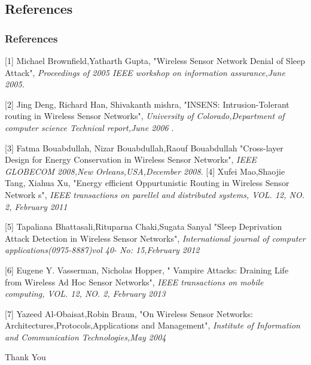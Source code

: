  \subsection{References}
\begin{frame}
\frametitle{References}
\footnotesize{
\begin{thebibliography}{99}



[1] Michael Brownfield,Yatharth Gupta,
 \newblock "Wireless Sensor Network Denial of Sleep Attack",
 \newblock \emph{Proceedings of 2005 IEEE workshop on information assurance,June 2005}.

 
  [2] Jing Deng, Richard Han, Shivakanth mishra,
 \newblock "INSENS: Intrusion-Tolerant routing in Wireless Sensor Networks",
 \newblock \emph{University of Colorado,Department of computer science Technical report,June 2006 }.

[3] Fatma Bouabdullah, Nizar Bouabdullah,Raouf Bouabdullah 
 \newblock "Cross-layer Design for Energy Conservation in  Wireless Sensor Networks",
 \newblock \emph{IEEE GLOBECOM 2008,New Orleans,USA,December 2008}.
 [4] Xufei Mao,Shaojie Tang, Xiahua Xu,
 \newblock "Energy efficient Oppurtunistic Routing in Wireless Sensor Network
s",
 \newblock \emph{IEEE transactions on parellel and distributed systems, VOL. 12, NO. 2, February 2011 }

[5] Tapaliana Bhattasali,Rituparna Chaki,Sugata Sanyal
 \newblock "Sleep Deprivation Attack Detection in Wireless Sensor Networks",
 \newblock \emph{International journal of computer applications(0975-8887)vol 40- No: 15,February 2012 }
 
 [6] Eugene Y. Vasserman, Nicholas Hopper,
 \newblock " Vampire Attacks: Draining Life from Wireless Ad Hoc Sensor Networks",
 \newblock \emph{IEEE transactions on mobile computing, VOL. 12, NO. 2, February 2013 }
 
  [7] Yazeed Al-Obaisat,Robin Braun,
 \newblock "On Wireless Sensor Networks: Architectures,Protocols,Applications and Management",
 \newblock \emph{Institute of Information and Communication Technologies,May 2004 }
  
\end{thebibliography}
}
\end{frame}

 
\begin{frame}
\centerline{Thank You}
\end{frame}



